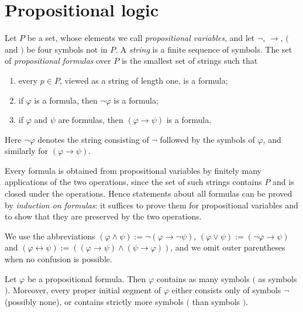 \section{Propositional logic}\label{logic:section-propositional}

\begin{definition}\label{logic:definition-propositional-formula}
Let $P$ be a set, whose elements we call \emph{propositional variables}, and
let $\neg$, $\to$, $($ and $)$ be four symbols not in $P$. A \emph{string} is a
finite sequence of symbols. The set of \emph{propositional formulas} over $P$
is the smallest set of strings such that
\begin{enumerate}
\item every $p \in P$, viewed as a string of length one, is a formula;
\item if $\varphi$ is a formula, then $\neg\varphi$ is a formula;
\item if $\varphi$ and $\psi$ are formulas, then $(\varphi \to \psi)$ is a
formula.
\end{enumerate}
Here $\neg\varphi$ denotes the string consisting of $\neg$ followed by the
symbols of $\varphi$, and similarly for $(\varphi \to \psi)$.
\end{definition}

\begin{remark}\label{logic:remark-induction-formulas}
Every formula is obtained from propositional variables by finitely many
applications of the two operations, since the set of such strings contains
$P$ and is closed under the operations. Hence statements about all formulas
can be proved by \emph{induction on formulas}: it suffices to prove them for
propositional variables and to show that they are preserved by the two
operations.
\end{remark}

\begin{notation}\label{logic:notation-connectives}
We use the abbreviations
$(\varphi \wedge \psi) := \neg(\varphi \to \neg\psi)$,
$(\varphi \vee \psi) := (\neg\varphi \to \psi)$ and
$(\varphi \leftrightarrow \psi) := ((\varphi \to \psi) \wedge (\psi \to \varphi))$,
and we omit outer parentheses when no confusion is possible.
\end{notation}

\begin{lemma}\label{logic:lemma-parentheses}
Let $\varphi$ be a propositional formula. Then $\varphi$ contains as many
symbols $($ as symbols $)$. Moreover, every proper initial segment of $\varphi$
either consists only of symbols $\neg$ (possibly none), or contains strictly
more symbols $($ than symbols $)$.
\end{lemma}

